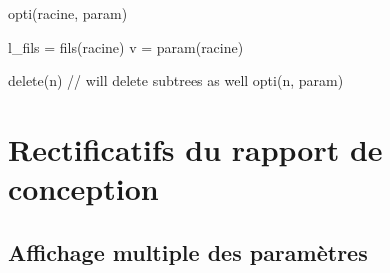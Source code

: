          \begin{algorithm}[h!]
            \caption{opti(racine, param)}
            \label{algo:opti}
            \begin{algorithmic}
                \STATE l\_fils = fils(racine)
                    \RETURN
                \ENDIF
                \STATE
                    \STATE v = param(racine)

                            \STATE delete(n) // will delete subtrees as well
                        \ENDIF
                    \ENDFOR
                \ENDIF
                \STATE
                    \STATE opti(n, param)
                \ENDFOR
            \end{algorithmic}
        \end{algorithm}

\newpage
\section{Rectificatifs du rapport de conception}
\label{sec:rectConc}


	\subsection{Affichage multiple des paramètres}

